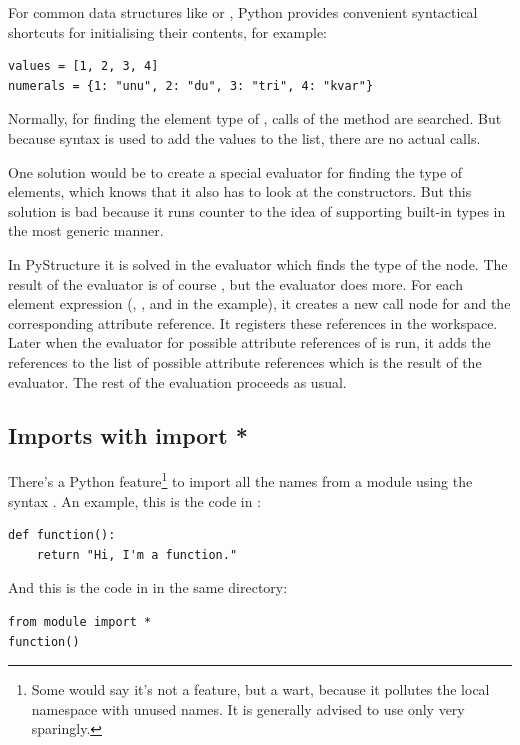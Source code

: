 \documentclass[12pt,halfparskip,DIV11,BCOR10mm]{scrreprt}
\begin{document}
For common data structures like  or , Python provides convenient syntactical shortcuts for initialising their contents, for example:

\begin{lstlisting}
values = [1, 2, 3, 4]
numerals = {1: "unu", 2: "du", 3: "tri", 4: "kvar"}
\end{lstlisting}

Normally, for finding the element type of , calls of the method  are searched. But because syntax is used to add the values to the list, there are no actual  calls.

One solution would be to create a special evaluator for finding the type of  elements, which knows that it also has to look at the constructors. But this solution is bad because it runs counter to the idea of supporting built-in types in the most generic manner.

In PyStructure it is solved in the evaluator which finds the type of the  node. The result of the evaluator is of course , but the evaluator does more. For each element expression (, ,  and  in the example), it creates a new call node for  and the corresponding attribute reference. It registers these references in the workspace. Later when the evaluator for possible attribute references of  is run, it adds the references to the list of possible attribute references which is the result of the evaluator. The rest of the evaluation proceeds as usual.


\subsection{Imports with import *}\label{import_star}

There's a Python feature\footnote{Some would say it's not a feature, but a wart, because it pollutes the local namespace with unused names. It is generally advised to use  only very sparingly.} to import all the names from a module using the syntax . An example, this is the code in :

\begin{lstlisting}
def function():
    return "Hi, I'm a function."
\end{lstlisting}

And this is the code in  in the same directory:

\begin{lstlisting}
from module import *
function()
\end{lstlisting}
\end{document}
